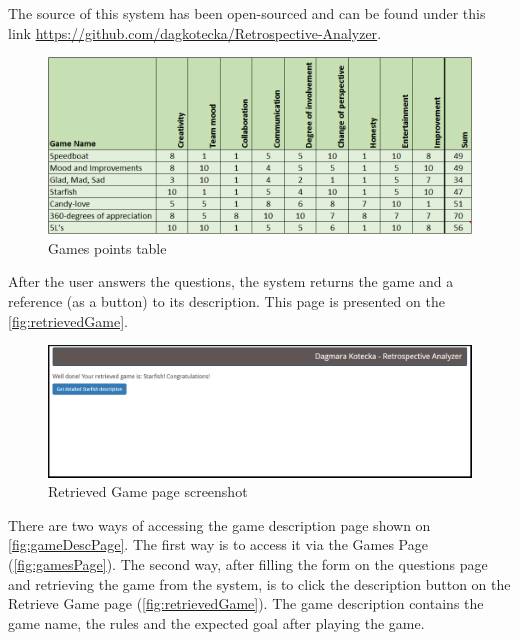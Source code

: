 The source of this system has been open-sourced and can be found under this link \url{https://github.com/dagkotecka/Retrospective-Analyzer}.

\begin{figure}[h]
\caption{Games points table}
\label{fig:gamesPoints}
\centering
\includegraphics[width=1\textwidth]{screenshots/gamesPoints.png}
\end{figure}

After the user answers the questions, the system returns the game and a reference (as a button) to its description. This page is presented on the \autoref{fig:retrievedGame}.

\begin{figure}[h]
\caption{Retrieved Game page screenshot}
\label{fig:retrievedGame}
\centering
\includegraphics[width=1\textwidth]{screenshots/retrievedGame.png}
\end{figure}

There are two ways of accessing the game description page shown on \autoref{fig:gameDescPage}. The first way is to access it via the Games Page (\autoref{fig:gamesPage}). The second way, after filling the form on the questions page and retrieving the game from the system, is to click the description button on the Retrieve Game page (\autoref{fig:retrievedGame}). The game description contains the game name, the rules and the expected goal after playing the game. 

